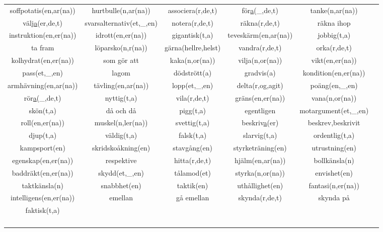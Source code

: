 \begin{center}
    \begin{adjustwidth}{-2cm}{}
        \begin{tabular}{|c c c c c c|}
            \hline
            soffpotatis(en,ar(na)) & hurtbulle(n,ar(na)) & associera(r,de,t) & för\underline{a}(\_,de,t) & tanke(n,ar(na)) & \\
            välj\underline{a}(er,de,t) & svarsalternativ(et,\_,en) & notera(r,de,t) & räkna(r,de,t) & räkna ihop & \\
            instruktion(en,er(na)) & idrott(en,er(na)) & gigantisk(t,a) & teveskärm(en,ar(na)) & jobbig(t,a) & \\
            ta fram & löparsko(n,r(na)) & gärna(hellre,helst) & vandra(r,de,t) & orka(r,de,t) & \\
            kolhydrat(en,er(na)) & som gör att & kaka(n,or(na)) & vilja(n,or(na)) & vikt(en,er(na)) & \\
            pass(et,\_,en) & lagom & dödstrött(a) & gradvis(a) & kondition(en,er(na)) & \\
            armhävning(en,ar(na)) & tävling(en,ar(na)) & lopp(et,\_,en) & delta(r,og,agit) & poäng(en,\_,en) & \\
            rör\underline{a}(\_,de,t) & nyttig(t,a) & vila(r,de,t) & gräns(en,er(na)) & vana(n,or(na)) & \\
            skön(t,a) & då och då & pigg(t,a) & egentligen & motargument(et,\_,en) & \\
            roll(en,er(na)) & muskel(n,ler(na)) & svettig(t,a) & beskriv\underline{a}(er) & beskrev,beskrivit & \\
            djup(t,a) & väldig(t,a) & falsk(t,a) & slarvig(t,a) & ordentlig(t,a) & \\
            kampsport(en) & skridskoåkning(en) & stavgång(en) & styrketräning(en) & utrustning(en) & \\
            egenskap(en,er(na)) & respektive & hitta(r,de,t) & hjälm(en,ar(na)) & bollkänsla(n) & \\
            baddräkt(en,er(na)) & skydd(et,\_,en) & tålamod(et) & styrka(n,or(na)) & envishet(en) & \\
            taktkänsla(n) & snabbhet(en) & taktik(en) & uthållighet(en) & fantasi(n,er(na)) & \\
            intelligens(en,er(na)) & emellan & gå emellan & skynda(r,de,t) & skynda på & \\
            faktisk(t,a) &  &  &  &  & \\
             &  &  &  &  & \\
             &  &  &  &  & \\
             &  &  &  &  & \\
             &  &  &  &  & \\
            \hline
        \end{tabular}
    \end{adjustwidth}
\end{center}

